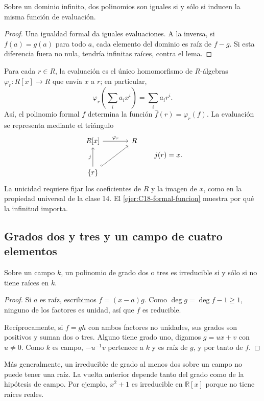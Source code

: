 \begin{coro}\label{coro:C19-funciones}
Sobre un dominio infinito, dos polinomios son iguales si y sólo si inducen la misma función de evaluación.
\end{coro}
\begin{proof}
Una igualdad formal da iguales evaluaciones. A la inversa, si $f(a)=g(a)$ para todo $a$, cada elemento del dominio es raíz de $f-g$. Si esta diferencia fuera no nula, tendría infinitas raíces, contra el lema.
\end{proof}
Para cada $r\in R$, la evaluación es el único homomorfismo de $R$-álgebras $\varphi_r:R[x]\to R$ que envía $x$ a $r$; en particular,
\[
\varphi_r\left(\sum_i a_ix^i\right)=\sum_i a_ir^i.
\]
Así, el polinomio formal $f$ determina la función $\widehat f(r)=\varphi_r(f)$. La evaluación se representa mediante el triángulo
\[
\begin{tikzcd}[column sep=large,row sep=large]
R[x]\arrow[r,"\varphi_r"]&R\\
\{r\}\arrow[u,"j"]\arrow[ur,hook]&
\end{tikzcd}
\qquad j(r)=x.
\]
La unicidad requiere fijar los coeficientes de $R$ y la imagen de $x$, como en la propiedad universal de la clase 14. El \cref{ejer:C18-formal-funcion} muestra por qué la infinitud importa.

\subsection{Grados dos y tres y un campo de cuatro elementos}
\begin{prop}\label{prop:C19-grados-bajos}
Sobre un campo $k$, un polinomio de grado dos o tres es irreducible si y sólo si no tiene raíces en $k$.
\end{prop}
\begin{proof}
Si $a$ es raíz, escribimos $f=(x-a)g$. Como $\deg g=\deg f-1\geq1$, ninguno de los factores es unidad, así que $f$ es reducible.

Recíprocamente, si $f=gh$ con ambos factores no unidades, sus grados son positivos y suman dos o tres. Alguno tiene grado uno, digamos $g=ux+v$ con $u\ne0$. Como $k$ es campo, $-u^{-1}v$ pertenece a $k$ y es raíz de $g$, y por tanto de $f$.
\end{proof}
Más generalmente, un irreducible de grado al menos dos sobre un campo no puede tener una raíz. La vuelta anterior depende tanto del grado como de la hipótesis de campo. Por ejemplo, $x^2+1$ es irreducible en $\mathbb R[x]$ porque no tiene raíces reales.

